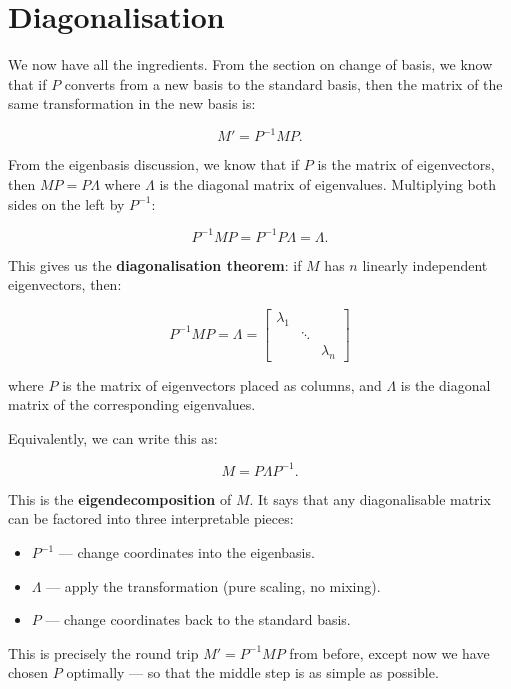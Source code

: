 \documentclass[11pt,openany]{book}
\theoremstyle{definition}
\begin{document}
\section{Diagonalisation}

We now have all the ingredients. From the section on change of basis, we know that
if $P$ converts from a new basis to the standard basis, then the matrix of the same
transformation in the new basis is:

\[
M' = P^{-1}MP.
\]

From the eigenbasis discussion, we know that if $P$ is the matrix of eigenvectors,
then $MP = P\Lambda$ where $\Lambda$ is the diagonal matrix of eigenvalues.
Multiplying both sides on the left by $P^{-1}$:

\[
P^{-1}MP = P^{-1}P\Lambda = \Lambda.
\]

This gives us the \textbf{diagonalisation theorem}: if $M$ has $n$ linearly
independent eigenvectors, then:

\[
\boxed{P^{-1}MP = \Lambda =
\begin{bmatrix} \lambda_1 & & \\ & \ddots & \\ & & \lambda_n \end{bmatrix}}
\]

where $P$ is the matrix of eigenvectors placed as columns, and $\Lambda$ is the
diagonal matrix of the corresponding eigenvalues.

\medskip

Equivalently, we can write this as:

\[
M = P \Lambda P^{-1}.
\]

This is the \textbf{eigendecomposition} of $M$. It says that any diagonalisable
matrix can be factored into three interpretable pieces:

\begin{itemize}
  \item $P^{-1}$ --- change coordinates into the eigenbasis.
  \item $\Lambda$ --- apply the transformation (pure scaling, no mixing).
  \item $P$ --- change coordinates back to the standard basis.
\end{itemize}

This is precisely the round trip $M' = P^{-1}MP$ from before, except now we have
chosen $P$ optimally --- so that the middle step is as simple as possible.
\end{document}
